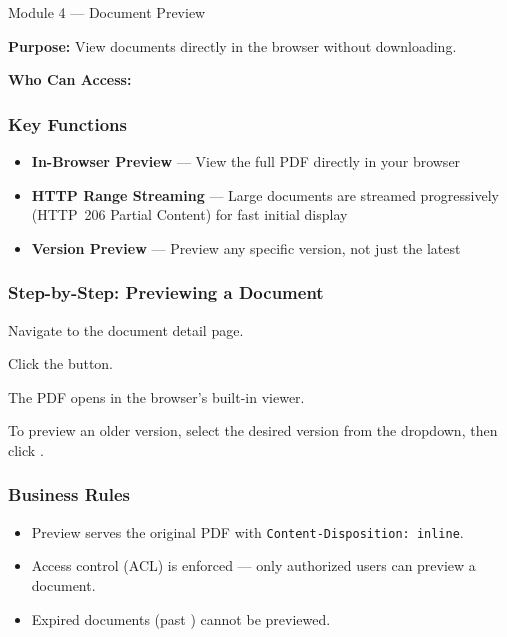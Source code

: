 \begin{ugModule}{Module 4 --- Document Preview}

  \textbf{Purpose:}
  View documents directly in the browser without downloading.

  \textbf{Who Can Access:}
     

  \subsubsection*{Key Functions}
  \begin{itemize}[leftmargin=18pt]
    \item \textbf{In-Browser Preview} --- View the full PDF
      directly in your browser
    \item \textbf{HTTP Range Streaming} --- Large documents are
      streamed progressively (HTTP~206 Partial Content) for
      fast initial display
    \item \textbf{Version Preview} --- Preview any specific
      version, not just the latest
  \end{itemize}

  \subsubsection*{Step-by-Step: Previewing a Document}
  \begin{ugSteps}
    \item Navigate to the document detail page.
    \item Click the  button.
    \item The PDF opens in the browser's built-in viewer.
    \item To preview an older version, select the desired version
          from the  dropdown, then click
          .
  \end{ugSteps}

  \subsubsection*{Business Rules}
  \begin{itemize}[leftmargin=18pt]
    \item Preview serves the original PDF with
          \texttt{Content-Disposition: inline}.
    \item Access control (ACL) is enforced --- only authorized
          users can preview a document.
    \item Expired documents (past ) cannot
          be previewed.
  \end{itemize}
\end{ugModule}

